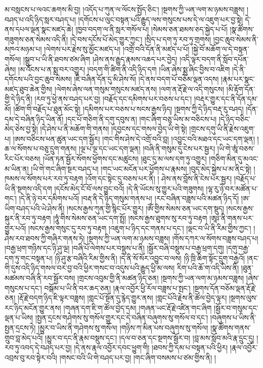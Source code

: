 མ་བསླངས་པ་ལའང་ཆགས་མི་བྱ། །འདོད་པ་ཀུན་ལ་ལོངས་སྤྱོད་ཅིང་། །སྔགས་ཀྱི་ཡན་ལག་མ་ཉམས་བཟླས། །བཤད་པ་འདི་ཉིད་སླར་བཤད་པ། །དགོངས་པ་ལུང་བསྟན་པའི་རྒྱུད་ལས་གསུངས་པས་དེ་ལ་འཇུག་པར་བྱ་སྟེ། དེ་ནས་དཔལ་ལྡན་སྣང་མཛད་ཆེ། །ཁྱབ་བདག་ལ་ནི་སླར་གསོལ་པ། །སེམས་ཅན་ཐམས་ཅད་སྐྱེད་པ་པོ། །སྣ་ཚོགས་གཟུགས་ཅན་སེམས་འདི་ནི། །དེ་བས་དངོས་པོ་མེད་གྱུར་ཀྱང་། །སྲིད་པ་དག་ཏུ་རབ་ཏུ་གྲགས། །བྱང་ཆུབ་སེམས་ནི་མཁའ་མཉམ་པ། །ལེགས་པར་རྗེས་སུ་མྱོང་མཛད་པ། །འགྲོ་བའི་དོན་ནི་མཛད་པ་པོ། །སྐྱེ་བོ་མཆོག་ལ་དེ་བསྟན་གསོལ། །སྒྲུབ་པ་ཡི་ནི་ཐབས་ཙམ་ཞིག །ཤེས་ནས་རྒྱུད་རྣམས་འཆད་པར་བྱེད། །འདི་ལྟར་བདག་ནི་སློབ་དཔོན་ཞེས། །མ་འོངས་པ་ན་སྨྲ་བར་འགྱུར། །བདག་གི་ཚིག་ནི་འདི་ཉིད་དག །ཡིན་ཞེས་སྨྲ་ཞིང་བྱིས་བ་འཇིག །དེ་ནི་དགོངས་པའི་བྱང་ཆུབ་སེམས། །ཇི་བཞིན་དོན་དུ་མི་ཤེས་སོ། །དེ་ནས་བདག་པོ་བཅོམ་ལྡན་འདས། །རྣམ་པར་སྣང་མཛད་ཐུབ་ཆེན་གྱིས། །ལེགས་ཞེས་ལན་གསུམ་གསུངས་མཛད་ནས། །ལག་ན་རྡོ་རྗེ་ལ་འདི་གསུངས། །མི་རྟོག་དོན་གྱི་དེ་ཉིད་ནི། །རབ་ཏུ་ཕྱེ་ནས་བཤད་པར་བྱ། །བརྗོད་དང་དམིགས་པར་བཅས་པ་དང་། །བརྡར་གྱུར་དང་ནི་དོན་དམ་མོ། །ཚིག་གི་བརྗོད་པ་ཐུན་མོང་སྟེ། །དམིགས་པར་བཅས་པ་སངས་རྒྱས་ཉིད། །སྔགས་ཀྱི་དེ་ཉིད་བརྡ་རུ་བཤད། །དོན་དམ་དེ་བཞིན་ཉིད་ཡིན་ནོ། །དང་པོ་གཅིག་ནི་དགུ་དབུས་ན། །གང་ཞིག་བཅུ་ཡིས་མ་བཅིངས་པ། །དེ་ཉིད་བཅིང་མེད་ཅེས་བྱ་སྟེ། །དེ་ཤེས་པ་ནི་མཆོག་གི་གནས། །དབྱངས་དང་གསལ་བྱེད་ཡི་གེ་སྟེ། །གྲངས་དགུ་ཡི་ནི་རྗེས་འཇུག་པ། །ཨས་བཅིངས་ཕན་ཚུན་ཡང་དག་སྦྱོར། །གང་གིས་ཤེས་དེ་འགྲོ་བའི་བླ། །འབྱུང་བའི་མཐའ་དང་ཡང་དག་ལྡན། །ཆ་ལ་སོགས་པ་བཅུ་དྲུག་གནས། །ལྔ་པ་ལྔ་དང་ཡང་དག་ལྡན། །བཞི་ནི་གསུམ་དུ་ངེས་པར་སྦྱར། །ཡི་གེ་ཨཱཾ་བཅས་རིང་པོར་བཅས། །ཡོན་ཏན་སྦྱོར་སོགས་ཕྱོགས་དང་མཚུངས། །ཐུང་དུ་མ་ལས་དག་ཏུ་འགྱུར། །གཅིག་མིན་དུ་མའང་མ་ཡིན་ན། །ཡི་གེ་གང་ཞིག་སྔར་བཤད་པ། །གང་ཡང་མངོན་པར་ཕྱོགས་པ་རྣམས། །བུད་མེད་སྐྱེས་པ་མ་ནིང་སྟེ། །ཁམས་ལ་སོགས་པར་རབ་ཏུ་བརྟག །འོག་དང་སྟེང་དུ་བཅས་པར་ནི། །
ཤེས་ནས་བློས་ནི་ངེས་པར་སྦྱར། །བརྗོད་པ་ཡི་ནི་སྔགས་འདི་དག །དངོས་མེད་ངོ་བོ་ལས་བྱུང་བའོ། །དེ་ནི་ཡོངས་སུ་གྱུར་པའི་གཟུགས། །ལྷ་རུ་ཉེ་བར་མཚོན་པ་གང་། །དེ་ནི་ཉེ་བར་དམིགས་པའོ། །བརྡ་ནི་དེ་ཉིད་གསུམ་གནས་པ། །རང་བཞིན་བཟླས་པའི་མཚན་ཉིད་དོ། །ཨ་ཡིག་བཤད་པའི་ཡེ་ཤེས་ནི། །སངས་རྒྱས་ཀུན་གྱི་སྙིང་པོར་གྱུར། །ཨོཾ་གྱིས་སེམས་ཅན་ཡང་དག་སྡུད། །སངས་རྒྱས་སྐུར་ནི་རབ་ཏུ་བརྟག །ཧཱུཾ་གིས་སེམས་ཅན་ཡང་དག་སྤྲོ། །སངས་རྒྱས་ཐུགས་སུ་རབ་ཏུ་བརྟག །ཨཱཿ་ནི་གནས་པར་གྱུར་པའོ། །སངས་རྒྱས་གསུང་དུ་རབ་ཏུ་བརྟག །འཇུག་པ་ཉིད་དང་གནས་པ་དང་། །ལྡང་བ་ཡི་ནི་རིམ་གྱིས་ཀྱང་། །ཤེས་རབ་ཐབས་ཀྱི་གཞིར་གནས་ཏེ། །སྔགས་ཀྱི་ཡན་ལག་མ་ཉམས་བཟླས། །གོས་དཀར་ལ་སོགས་བཟླས་བཤད་པ། །བརྒྱ་ཕྲག་གཉིས་དང་ཉི་ཤུ་ལྔ། །བཞི་པོ་ལེགས་པར་བསྡུས་པ་ནི། །སྦྱོར་བཞི་བསྡུས་པ་བརྒྱ་ཕྲག་དགུ། །དགུ་བརྒྱ་དག་ཏུ་གང་བསྟན་པ། །ཉི་ཤུ་རྩ་བཞིའི་རིམ་གྱིས་ནི། །དེ་ནི་སོ་སོར་འབྱུང་བ་ལས། །ཉི་ཁྲི་ཆིག་སྟོང་དྲུག་བརྒྱའོ། །ནང་གི་དུས་འདི་ཉིད་གསལ་བར་བྱ་བའི་ཕྱིར་གསང་བ་འདུས་པའི་རྒྱུད་ཕྱི་མ་ལས། རིག་པའི་ཆོ་ག་འདི་ཡིས་ནི། །ཐུན་མཚམས་བཞི་ནི་རབ་སྦྱོར་བས། །གྲངས་འབུམ་གྱི་ནི་མཚན་ཉིད་ཅན། །སྔགས་ཀྱི་ཡན་ལག་མ་ཉམས་བཟླས། །ཞེས་གསུངས་པ་དང་། བསྒོམ་པ་ཡི་ནི་བར་ཆད་ཅན། །རྣལ་འབྱོར་ཕྱི་རོལ་བཟླས་པ་སྤང་། །སྔགས་དོན་བཅོམ་ལྡན་རྡོ་རྗེ་ཅན། །རྡོ་རྗེ་བདག་ཉིད་ཇི་ལྟར་བཟླས། །གླང་པོ་སྔོན་དུ་རྙེད་གྱུར་ནས། །གླང་པོའི་རྗེས་ནི་ཚོལ་བྱེད་ལྟར། །སྔགས་ལུས་རང་ཉིད་མངོན་གྱུར་ནས། །གཞན་དག་ཇི་ག་ཚོལ་བྱེད་དམ། །གཞན་ཡང་རྡོ་རྗེ་འཛིན་གང་ཞིག །སྦྱོར་བ་གསུམ་དང་ལྡན་པ་ཡིས། །སྤྱན་དྲངས་གཤེགས་སུ་གསོལ་གྱུར་དང་དེ་བཞིན་བཞུགས་སུ་གསོལ་བ་དང་། །བཞུགས་པ་ཡིས་ནི་སྤྱན་དྲངས་ཏེ། །མྱུར་བ་ཡིས་ནི་གཤེགས་སུ་གསོལ། །གཉིས་ཀ་མིན་པས་བཞུགས་སུ་གསོལ། །སྣ་ཚོགས་གནས་གྲུབ་བླ་མེད་པའོ། །མྱུར་བ་དང་ནི་རྣམ་བསྡུས་དང་། །དལ་བ་ཅན་དང་སྔགས་སྦྱོར་བ། །བླ་མས་སློབ་མའི་རྣ་དྲུང་དུ། །རབ་ཏུ་འབད་དེ་བཤད་པར་བྱ། །དེ་ནས་རྣལ་འབྱོར་དབང་ཕྱུག་གི། །ཐབས་ཀྱི་དམ་པ་བསྟན་པའི་ཕྱིར། །རྣལ་འབྱོར་འབྲས་བུ་རབ་སྟེར་བའི། །གསང་བའི་ཡི་གེ་བཤད་པར་བྱ། །གང་ཞིག་བསམས་པ་ཙམ་གྱིས་ནི། །
